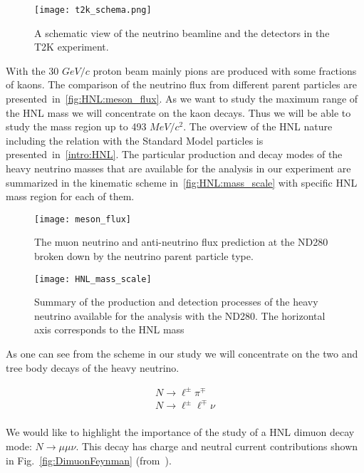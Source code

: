\documentclass[../main.tex]{subfiles}
\begin{document}
\begin{figure}[h!]
    \centering
    \texttt{[image: t2k\_schema.png]}
    \caption{A schematic view of the neutrino beamline and the detectors in the T2K experiment.}
    \label{fig:HNL:t2k_schema}
\end{figure}

With the 30 $GeV/c$ proton beam mainly pions are produced with some fractions of kaons. The comparison of the neutrino flux from different parent particles are presented~in~\autoref{fig:HNL:meson_flux}. As we want to study the maximum range of the HNL mass we will concentrate on the kaon decays. Thus we will be able to study the mass region up to 493 $MeV/c^2$. The overview of the HNL nature including the relation with the Standard Model particles is presented~in~\autoref{intro:HNL}. The particular production and decay modes of the heavy neutrino masses that are available for the analysis in our experiment are summarized in the kinematic scheme in~\autoref{fig:HNL:mass_scale} with specific HNL mass region for each of them.

\begin{figure}[h!]
    \centering
    \texttt{[image: meson\_flux]}
    \caption{The muon neutrino and anti-neutrino flux prediction at the ND280 broken down by the neutrino parent particle type.}
    \label{fig:HNL:meson_flux}
\end{figure}

\begin{figure}[h!]
    \centering
    \texttt{[image: HNL\_mass\_scale]}
    \caption{Summary of the production and detection processes of the heavy neutrino available for the analysis with the ND280. The horizontal axis corresponds to the HNL mass}
    \label{fig:HNL:mass_scale}
\end{figure}

As one can see from the scheme in our study we will concentrate on the two and tree body decays of the heavy neutrino.

\begin{eqnarray}
    &N\to\ell^{\pm}\pi^{\mp} &\\
    &N\to\ell^{\pm}\ell^{\mp}\nu & \\
\end{eqnarray}

We would like to highlight the importance of the study of a HNL dimuon decay mode: $N\to\mu\mu\nu$. This decay has charge and neutral current contributions shown in Fig.~\ref{fig:DimuonFeynman} (from~\cite{Johnson1997}).
\end{document}
